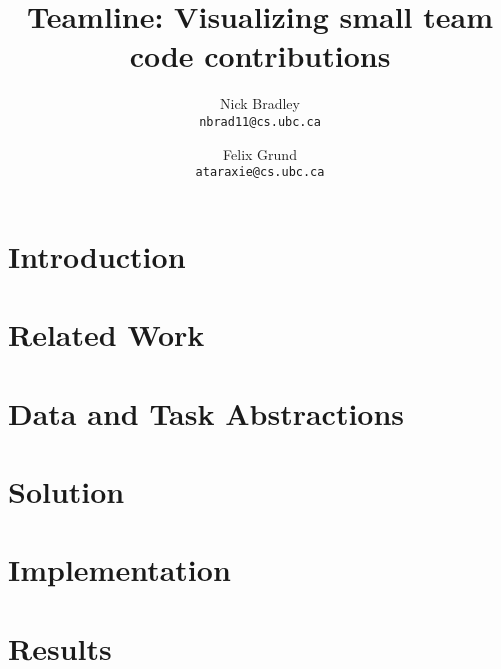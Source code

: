 \documentclass[preprint,journal]{vgtc}       %
\title{Teamline: Visualizing small team code contributions}
\author{
  Nick Bradley\\   \texttt{nbrad11@cs.ubc.ca}
  \and
  Felix Grund\\    \texttt{ataraxie@cs.ubc.ca}
}
\begin{document}



\maketitle



\section{Introduction}
  \label{sec:into}
  

\section{Related Work}
  \label{sec:prev-work}
  

\section{Data and Task Abstractions}
  \label{sec:abstractions}
  

\section{Solution}
  \label{sec:solution}
  

\section{Implementation}
  \label{sec:implementation}
  

\section{Results}
  \label{sec:results}
  
\end{document}
